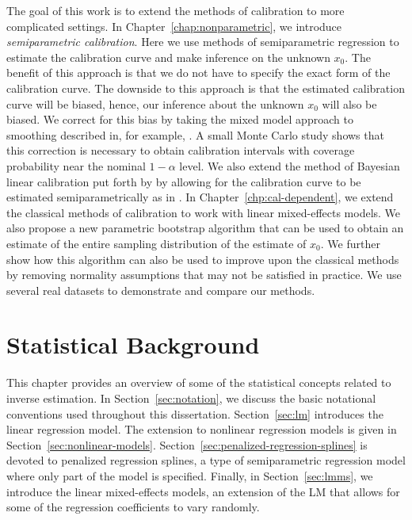 \documentclass[cmfont,usenames,dvipsnames,leqno]{afit-etd}\usepackage[]{graphicx}\usepackage[]{color}
\begin{document}
The goal of this work is to extend the methods of calibration to more complicated settings. In Chapter~\ref{chap:nonparametric}, we introduce \textit{semiparametric calibration}. Here we use methods of semiparametric regression to estimate the calibration curve and make inference on the unknown $x_0$. The benefit of this approach is that we do not have to specify the exact form of the calibration curve. The downside to this approach is that the estimated calibration curve will be biased, hence, our inference about the unknown $x_0$ will also be biased. We correct for this bias by taking the mixed model approach to smoothing described in, for example, \citet{ruppert_semiparametric_2003}. A small Monte Carlo study shows that this correction is necessary to obtain calibration intervals with coverage probability near the nominal $1-\alpha$ level. We also extend the method of Bayesian linear calibration put forth by \citet{hoadley_bayesian_1970} by allowing for the calibration curve to be estimated semiparametrically as in \citet{crainiceanu_bayesian_2005}. In Chapter~\ref{chp:cal-dependent}, we extend the classical methods of calibration to work with linear mixed-effects models. We also propose a new parametric bootstrap algorithm that can be used to obtain an estimate of the entire sampling distribution of the estimate of $x_0$. We further show how this algorithm can also be used to improve upon the classical methods by removing normality assumptions that may not be satisfied in practice. We use several real datasets to demonstrate and compare our methods.





\chapter{Statistical Background}
\label{chp:background}
This chapter provides an overview of some of the statistical concepts related to inverse estimation. In Section~\ref{sec:notation}, we discuss the basic notational conventions used throughout this dissertation. Section~\ref{sec:lm} introduces the linear regression model. The extension to nonlinear regression models is given in Section~\ref{sec:nonlinear-models}. Section~\ref{sec:penalized-regression-splines} is devoted to penalized regression splines, a type of semiparametric regression model where only part of the model is specified. Finally, in Section~\ref{sec:lmms}, we introduce the linear mixed-effects models, an extension of the \ac{LM} that allows for some of the regression coefficients to vary randomly. 
\end{document}
